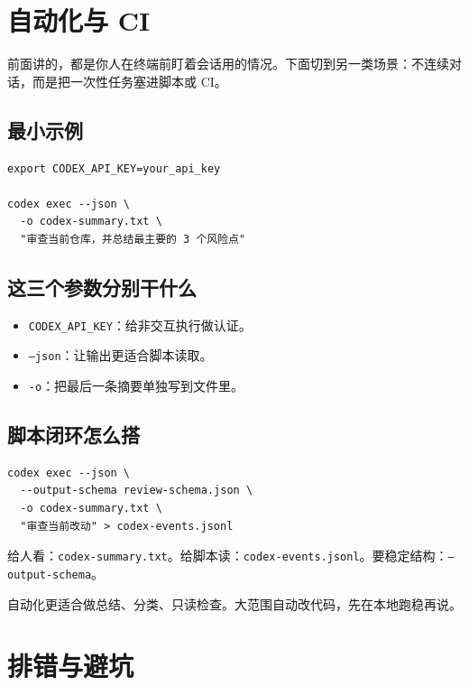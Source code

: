 \documentclass[UTF8,a4paper,11pt]{ctexart}
\begin{document}
\section{自动化与 CI}

前面讲的，都是你人在终端前盯着会话用的情况。下面切到另一类场景：不连续对话，而是把一次性任务塞进脚本或 CI。

\subsection{最小示例}

\begin{lstlisting}[style=cli]
export CODEX_API_KEY=your_api_key

codex exec --json \
  -o codex-summary.txt \
  "审查当前仓库，并总结最主要的 3 个风险点"
\end{lstlisting}

\subsection{这三个参数分别干什么}

\begin{itemize}
  \item \texttt{CODEX\_API\_KEY}：给非交互执行做认证。
  \item \texttt{--json}：让输出更适合脚本读取。
  \item \texttt{-o}：把最后一条摘要单独写到文件里。
\end{itemize}

\subsection{脚本闭环怎么搭}

\begin{lstlisting}[style=cli]
codex exec --json \
  --output-schema review-schema.json \
  -o codex-summary.txt \
  "审查当前改动" > codex-events.jsonl
\end{lstlisting}

给人看：\texttt{codex-summary.txt}。给脚本读：\texttt{codex-events.jsonl}。要稳定结构：\texttt{--output-schema}。

\begin{warnbox}
自动化更适合做总结、分类、只读检查。大范围自动改代码，先在本地跑稳再说。
\end{warnbox}

\section{排错与避坑}
\end{document}
